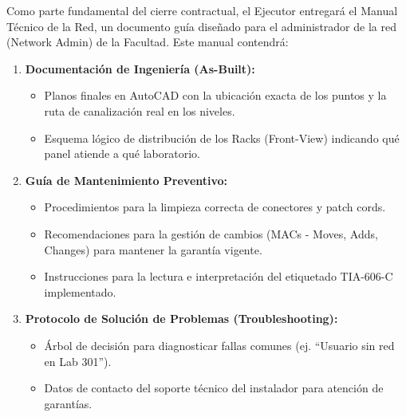 Como parte fundamental del cierre contractual, el Ejecutor entregará el Manual Técnico de la Red, un documento guía diseñado para el administrador de la red (Network Admin) de la Facultad. Este manual contendrá:

\begin{enumerate}
    \item \textbf{Documentación de Ingeniería (As-Built):}
    \begin{itemize}
        \item Planos finales en AutoCAD con la ubicación exacta de los \textbf{\totalPuntos{}} puntos y la ruta de canalización real en los \totalPisos{} niveles.
        \item Esquema lógico de distribución de los Racks (Front-View) indicando qué panel atiende a qué laboratorio.
    \end{itemize}
    \item \textbf{Guía de Mantenimiento Preventivo:}
    \begin{itemize}
        \item Procedimientos para la limpieza correcta de conectores y patch cords.
        \item Recomendaciones para la gestión de cambios (MACs - Moves, Adds, Changes) para mantener la garantía vigente.
        \item Instrucciones para la lectura e interpretación del etiquetado TIA-606-C implementado.
    \end{itemize}
    \item \textbf{Protocolo de Solución de Problemas (Troubleshooting):}
    \begin{itemize}
        \item Árbol de decisión para diagnosticar fallas comunes (ej. ``Usuario sin red en Lab 301'').
        \item Datos de contacto del soporte técnico del instalador para atención de garantías.
    \end{itemize}
\end{enumerate}
